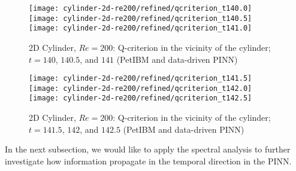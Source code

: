\begin{figure}[hbt!]
    \centering
    \texttt{[image: cylinder-2d-re200/refined/qcriterion\_t140.0]}
    \newline
    \texttt{[image: cylinder-2d-re200/refined/qcriterion\_t140.5]}
    \newline
    \texttt{[image: cylinder-2d-re200/refined/qcriterion\_t141.0]}
    \caption{2D Cylinder, $Re=200$: Q-criterion in the vicinity of the cylinder; $t=140$, $140.5$, and $141$ (PetIBM and data-driven PINN)}
    \label{fig:cylinder-2d-re200-refined-q-1}
\end{figure}

\begin{figure}[hbt!]
    \centering
    \texttt{[image: cylinder-2d-re200/refined/qcriterion\_t141.5]}
    \newline
    \texttt{[image: cylinder-2d-re200/refined/qcriterion\_t142.0]}
    \newline
    \texttt{[image: cylinder-2d-re200/refined/qcriterion\_t142.5]}
    \caption{2D Cylinder, $Re=200$: Q-criterion in the vicinity of the cylinder; $t=141.5$, $142$, and $142.5$ (PetIBM and data-driven PINN)}
    \label{fig:cylinder-2d-re200-refined-q-2}
\end{figure}

In the next subsection, we would like to apply the spectral analysis to further investigate how information propagate in the temporal direction in the PINN.

\FloatBarrier
